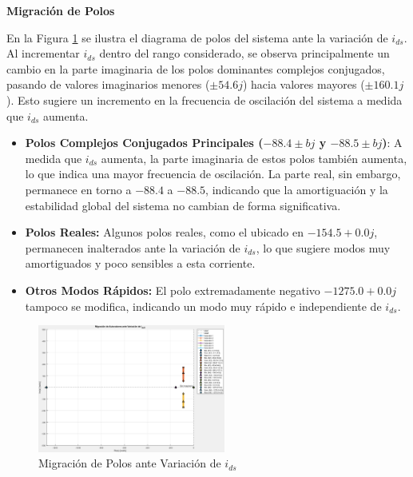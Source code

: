 \documentclass{article}
\begin{document}
\textbf{Migración de Polos}

En la Figura \ref{fig:migracion_polos_i_ds} se ilustra el diagrama de polos del sistema ante la variación de \( i_{ds} \). Al incrementar \( i_{ds} \) dentro del rango considerado, se observa principalmente un cambio en la parte imaginaria de los polos dominantes complejos conjugados, pasando de valores imaginarios menores (\(\pm 54.6j\)) hacia valores mayores (\(\pm 160.1j\)). Esto sugiere un incremento en la frecuencia de oscilación del sistema a medida que \( i_{ds} \) aumenta.

\begin{itemize}
    \item \textbf{Polos Complejos Conjugados Principales (\(-88.4 \pm bj\) y \(-88.5 \pm bj\))}: A medida que \( i_{ds} \) aumenta, la parte imaginaria de estos polos también aumenta, lo que indica una mayor frecuencia de oscilación. La parte real, sin embargo, permanece en torno a \(-88.4\) a \(-88.5\), indicando que la amortiguación y la estabilidad global del sistema no cambian de forma significativa.

    \item \textbf{Polos Reales:}  
    Algunos polos reales, como el ubicado en \(-154.5+0.0j\), permanecen inalterados ante la variación de \( i_{ds} \), lo que sugiere modos muy amortiguados y poco sensibles a esta corriente.

    \item \textbf{Otros Modos Rápidos:}  
    El polo extremadamente negativo \(-1275.0+0.0j\) tampoco se modifica, indicando un modo muy rápido e independiente de \( i_{ds} \).
\end{itemize}

\begin{figure}[H]
    \centering
    \includegraphics[width=0.55\textwidth]{Imagenes/MigracionLPV_1.png}
    \caption{Migración de Polos ante Variación de \( i_{ds} \)}
    \label{fig:migracion_polos_i_ds}
\end{figure}
\end{document}
